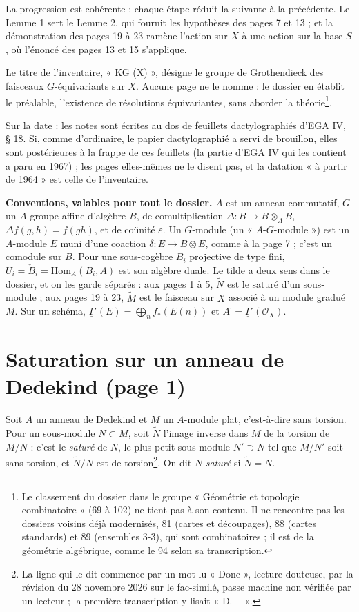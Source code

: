 \documentclass[11pt,a4paper]{article}
\begin{document}
La progression est cohérente : chaque étape réduit la suivante à la
précédente. Le Lemme 1 sert le Lemme 2, qui fournit les hypothèses des pages
7 et 13 ; et la démonstration des pages 19 à 23 ramène l'action sur $X$ à
une action sur la base $S$, où l'énoncé des pages 13 et 15 s'applique.

Le titre de l'inventaire, « KG (X) », désigne le groupe de Grothendieck des
faisceaux $G$-équivariants sur $X$. Aucune page ne le nomme : le dossier en
établit le préalable, l'existence de résolutions équivariantes, sans aborder
la théorie\footnote{Le classement du dossier dans le groupe « Géométrie et
topologie combinatoire » (69 à 102) ne tient pas à son contenu. Il ne
rencontre pas les dossiers voisins déjà modernisés, 81 (cartes et
découpages), 88 (cartes standards) et 89 (ensembles 3-3), qui sont
combinatoires ; il est de la géométrie algébrique, comme le 94 selon sa
transcription.}.

Sur la date : les notes sont écrites au dos de feuillets dactylographiés
d'EGA IV, § 18. Si, comme d'ordinaire, le papier dactylographié a servi de
brouillon, elles sont postérieures à la frappe de ces feuillets (la partie
d'EGA IV qui les contient a paru en 1967) ; les pages elles-mêmes ne le
disent pas, et la datation « à partir de 1964 » est celle de l'inventaire.

\textbf{Conventions, valables pour tout le dossier.} $A$ est un anneau
commutatif, $G$ un $A$-groupe affine d'algèbre $B$, de comultiplication
$\Delta \colon B \to B \otimes_A B$, $\Delta f(g,h) = f(gh)$, et de coünité
$\varepsilon$. Un $G$-module (un « $A$-$G$-module ») est un $A$-module $E$
muni d'une coaction $\delta \colon E \to B \otimes E$, comme à la page 7 ;
c'est un comodule sur $B$. Pour une sous-cogèbre $B_i$ projective de type
fini, $U_i = \check{B}_i = \mathrm{Hom}_A(B_i, A)$ est son algèbre duale. Le
tilde a deux sens dans le dossier, et on les garde séparés : aux pages 1 à 5,
$\widetilde{N}$ est le saturé d'un sous-module ; aux pages 19 à 23,
$\widetilde{M}$ est le faisceau sur $X$ associé à un module gradué $M$. Sur
un schéma, $\underline{\Gamma}^{\cdot}(E) = \bigoplus_n f_{*}(E(n))$ et
$A^{\cdot} = \underline{\Gamma}^{\cdot}(\mathcal{O}_X)$.

\section*{Saturation sur un anneau de Dedekind (page 1)}

Soit $A$ un anneau de Dedekind et $M$ un $A$-module plat, c'est-à-dire sans
torsion. Pour un sous-module $N \subset M$, soit $\widetilde{N}$ l'image
inverse dans $M$ de la torsion de $M/N$ : c'est le \emph{saturé} de $N$, le
plus petit sous-module $N' \supset N$ tel que $M/N'$ soit sans torsion, et
$\widetilde{N}/N$ est de torsion\footnote{La ligne qui le dit commence par un
mot lu « Donc », lecture douteuse, par la révision du 28 novembre 2026 sur le fac-similé, passe machine non vérifiée par un lecteur ; la
première transcription y lisait « D.--- ».}. On dit $N$
\emph{saturé} si $\widetilde{N} = N$.
\end{document}
